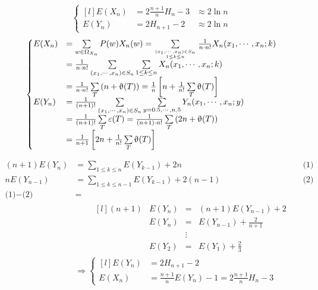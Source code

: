 \documentclass[12pt,a4paper,oneside]{report}
\begin{document}
\begin{theorem}
\begin{align*}
	\left\{\begin{matrix*}[l]
		E(X_n) &= 2 \frac{n+1}{n} H_n - 3 &\approx 2 \ln n \\
		E(Y_n) &= 2 H_{n+1} - 2 &\approx 2 \ln n
	\end{matrix*}\right.
\end{align*}
\begin{align*}
	\left\{\begin{matrix*}[l]
		E(X_n) 
			&= \sum\limits_{w \in \Omega_{X_n} } P(w) X_n(w) 
				= \sum\limits_{(x_1, \cdots, x_n) \in S_n \atop 1 \le k \le n} 
					\frac{1}{n \cdot n!} X_n (x_1, \cdots, x_n ; k) \\
			&= \frac{1}{n \cdot n!} 
				\sum\limits_{(x_1, \cdots, x_n) \in S_n} \sum\limits_{1 \le k \le n} 
					X_n (x_1, \cdots, x_n ; k) \\
			&= \frac{1}{n \cdot n!} \sum\limits_{T} \left(n + \upvartheta(T) \right) 
				= \frac{1}{n} 
					\left[ n + \frac{1}{n!} \sum\limits_{T} \upvartheta(T)\right]\\
		E(Y_n) 
			&= \frac{1}{(n+1)!} \sum\limits_{(x_1, \cdots, x_n) \in S_n}
					\sum\limits_{y = 0.5, \cdots, n.5} Y_n(x_1 , \cdots, x_n ; y) \\
			&= \frac{1}{(n+1)!} \sum\limits_{T} \varepsilon(T) 
				= \frac{1}{(n+1) \cdot n!} \sum\limits_{T} \left(2n + \upvartheta(T)\right) \\
			&= \frac{1}{n+1} \left[2n + \frac{1}{n!} \sum\limits_{T} \upvartheta(T)\right]
	\end{matrix*}\right.
\end{align*}
\end{theorem}

\begin{align*}
	(n+1) E(Y_n) &= \sum\limits_{1 \le k \le n} E(Y_{k-1}) + 2n 
		&& \text{(1)} \\
	n E(Y_{n-1}) &= \sum\limits_{1 \le k \le n-1} E(Y_{k-1}) + 2(n-1)
		&& \text{(2)} \\
	\text{(1)} - \text{(2)} &=\\
		& \qquad
		\begin{matrix*}[l]
		 	(n+1) &E(Y_n) &=& (n+1) E(Y_{n-1}) + 2 \\
			&E(Y_n) &=& E(Y_{n-1}) + \frac{2}{n+1} \\
			& & \vdots &\\
			&E(Y_2) &=& E(Y_1) + \frac{2}{3}
		\end{matrix*} \\
	&\Rightarrow
		\left\{\begin{matrix*}[l]
			E(Y_n) &= 2 H_{n+1} - 2 \\
			E(X_n) &= \frac{n+1}{n} E(Y_{n}) - 1 = 2 \frac{n+1}{n} H_n - 3
		\end{matrix*}\right.
\end{align*}
\end{document}
